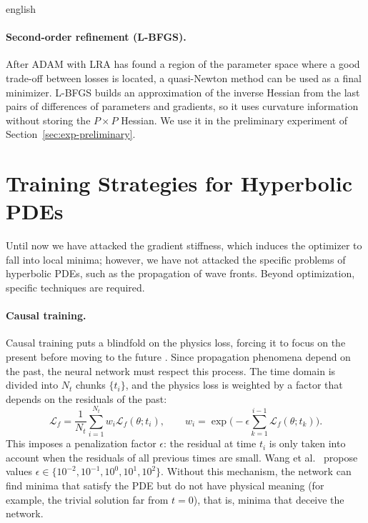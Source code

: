\documentclass[11pt,letterpaper,twoside,openright]{book} %
\newcommand{\Loss}{\mathcal{L}}
\newif\ifreviewmode
\newcommand{\revtag}[2]{\ifreviewmode{\color{red!70!black}\textsf{\footnotesize[#1#2]}}\fi}
\newcommand{\verificar}[1]{\revtag{VERIFICAR}{: #1}}
\begin{document}
\begin{hyphenrules}{english}
\paragraph{Second-order refinement (L-BFGS).}
After ADAM with LRA has found a region of the parameter space where a good trade-off between losses is
located, a quasi-Newton method can be used as a final minimizer. L-BFGS builds an approximation of the
inverse Hessian from the last pairs of differences of parameters and gradients, so it uses curvature
information without storing the $P\times P$ Hessian.\verificar{add reference for L-BFGS (Liu \& Nocedal,
1989)} We use it in the preliminary experiment of Section~\ref{sec:exp-preliminary}.

\section{Training Strategies for Hyperbolic PDEs}\label{sec:training-strategies}

Until now we have attacked the gradient stiffness, which induces the optimizer to fall into local minima;
however, we have not attacked the specific problems of hyperbolic PDEs, such as the propagation of wave
fronts. Beyond optimization, specific techniques are required.

\paragraph{Causal training.}
Causal training puts a blindfold on the physics loss, forcing it to focus on the present before moving
to the future \cite{wang2024causality}. Since propagation phenomena depend on the past, the neural
network must respect this process. The time domain is divided into $N_t$ chunks $\{t_i\}$, and the
physics loss is weighted by a factor that depends on the residuals of the past:
\begin{equation}
  \Loss_f=\frac{1}{N_t}\sum_{i=1}^{N_t}w_i\Loss_f(\theta;t_i),\qquad
  w_i=\exp\Big(-\epsilon\sum_{k=1}^{i-1}\Loss_f(\theta;t_k)\Big).
  \label{eq:causal}
\end{equation}
This imposes a penalization factor $\epsilon$: the residual at time $t_i$ is only taken into account when
the residuals of all previous times are small. Wang et al.~\cite{wang2024causality} propose values
$\epsilon\in\{10^{-2},10^{-1},10^{0},10^{1},10^{2}\}$. Without this mechanism, the network can find
minima that satisfy the PDE but do not have physical meaning (for example, the trivial solution far from
$t=0$), that is, minima that deceive the network.


\end{hyphenrules}
\end{document}
